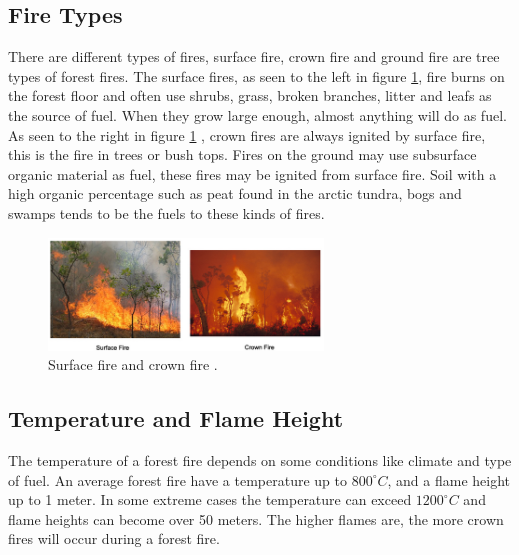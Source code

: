\subsection{Fire Types}
There are different types of fires, surface fire, crown fire and ground fire are tree types of forest fires. The surface fires, as seen to the left in figure \ref{fig:fire-types}, fire burns on the forest floor and often use shrubs, grass, broken branches, litter and leafs as the source of fuel. When they grow large enough, almost anything will do as fuel. As seen to the right in figure \ref{fig:fire-types} , crown fires are always ignited by surface fire, this is the fire in trees or bush tops. Fires on the ground may use subsurface organic material as fuel, these fires may be ignited from surface fire. Soil with a high organic percentage such as peat found in the arctic tundra, bogs and swamps tends to be the fuels to these kinds of fires.

\begin{figure}[here]
  \centering
      \includegraphics[width=0.65\textwidth]{theory/graphics/fire-types.png}
  \caption{Surface fire and crown fire \cite{firebev}. }
  \label{fig:fire-types}
\end{figure}

\subsection{Temperature and Flame Height}
The temperature of a forest fire depends on some conditions like climate and type of fuel. An average forest fire have a temperature up to $800^{\circ}C$, and a flame height up to 1 meter. In some extreme cases the temperature can exceed $1200^{\circ}C$ and flame heights can become over 50 meters. The higher flames are, the more crown fires will occur during a forest fire. \cite{firebas}
